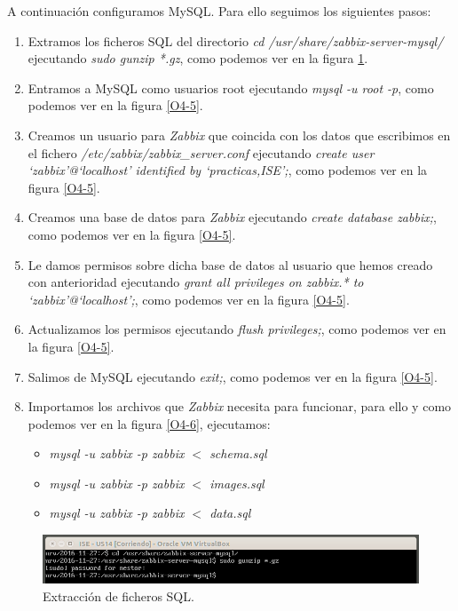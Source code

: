 \documentclass[a4paper,titlepage,12pt]{scrartcl}	%
\numberwithin{figure}{section} %
\numberwithin{table}{section} %
\begin{document}
	A continuación configuramos MySQL. Para ello seguimos los siguientes pasos:
	\begin{enumerate}
		\item Extramos los ficheros SQL del directorio \textit{cd /usr/share/zabbix-server-mysql/} ejecutando \textit{sudo gunzip *.gz}, como podemos ver en la figura \ref{O4-4}.
		\item Entramos a MySQL como usuarios root ejecutando \textit{mysql -u root -p}, como podemos ver en la figura \ref{O4-5}.
		\item Creamos un usuario para \textit{Zabbix} que coincida con los datos que escribimos en el fichero \textit{/etc/zabbix/zabbix\_server.conf} ejecutando \textit{create user `zabbix'@`localhost' identified by `practicas,ISE';}, como podemos ver en la figura \ref{O4-5}.
		\item Creamos una base de datos para \textit{Zabbix} ejecutando \textit{create database zabbix;}, como podemos ver en la figura \ref{O4-5}.
		\item Le damos permisos sobre dicha base de datos al usuario que hemos creado con anterioridad ejecutando \textit{grant all privileges on zabbix.* to `zabbix'@`localhost';}, como podemos ver en la figura \ref{O4-5}.
		\item Actualizamos los permisos ejecutando \textit{flush privileges;}, como podemos ver en la figura \ref{O4-5}.
		\item Salimos de MySQL ejecutando \textit{exit;}, como podemos ver en la figura \ref{O4-5}.
		\item Importamos los archivos que \textit{Zabbix} necesita para funcionar, para ello y como podemos ver en la figura \ref{O4-6}, ejecutamos:
			\begin{itemize}
				\item \textit{mysql -u zabbix -p zabbix $<$ schema.sql}
				\item \textit{mysql -u zabbix -p zabbix $<$ images.sql}
				\item \textit{mysql -u zabbix -p zabbix $<$ data.sql}
			\end{itemize}
	\end{enumerate}
	
	\begin{figure}[H]
		\includegraphics[width=\linewidth]{./Imagenes/O4-4.png}
		\vspace{-0.5cm}
		\caption[Extracción de ficheros SQL.]{Extracción de ficheros SQL.}
		\label{O4-4}
	\end{figure}
	
\end{document}
